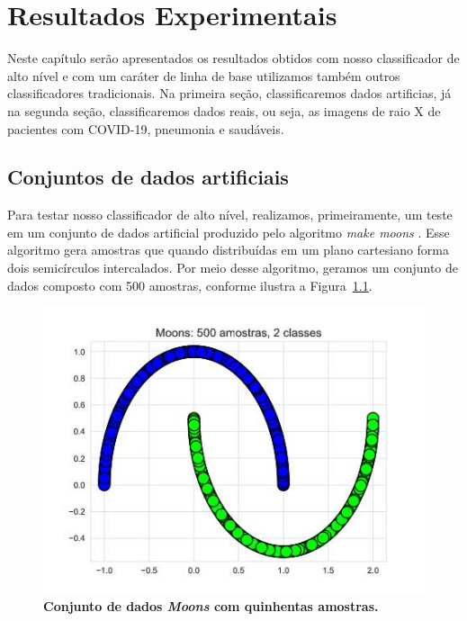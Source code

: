 \documentclass[
12pt,        %
oneside,     %
a4paper,     %
english,       %
brazil        %
%
%
]{ppgca}
\begin{document}
\chapter{Resultados Experimentais}
Neste capítulo serão apresentados os resultados obtidos com nosso classificador de alto nível e com um caráter de linha de base utilizamos também outros classificadores tradicionais. Na primeira seção, classificaremos dados artificias, já na segunda seção, classificaremos dados reais, ou seja, as imagens de raio X de pacientes com COVID-19, pneumonia e saudáveis.

\section{Conjuntos de dados artificiais}
Para testar nosso classificador de alto nível, realizamos, primeiramente, um teste em um conjunto de dados artificial produzido pelo algoritmo \textit{make moons} \cite{scikit-learn}. Esse algoritmo gera amostras que quando distribuídas em um plano cartesiano forma dois semicírculos intercalados. Por meio desse algoritmo, geramos um conjunto de dados composto com 500 amostras, conforme ilustra a Figura~\ref{fig:artificial_moons}. 

\begin{figure}[H]
    \includegraphics[scale=0.6]{artificial_moons.png}
    \centering
    \caption{\textbf{Conjunto de dados \textit{Moons} com quinhentas amostras.}}
    \label{fig:artificial_moons}
\end{figure}
\end{document}
